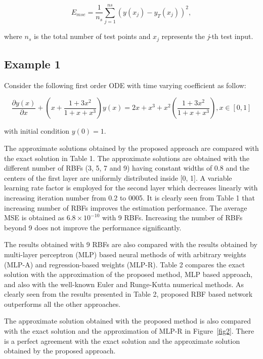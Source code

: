 \documentclass{mc}
\begin{document}
\begin{equation}
E_{mse}=\frac{1}{n_s}\sum_{j=1}^{ns}\left ( y(x_j)-y_T(x_j) \right )^{2},
\end{equation}

where $n_s$ is the total number of test points and $x_j$ represents the {\it{j}}-th test input.

\subsection{Example 1}

Consider the following first order ODE with time varying coefficient as follow:

\begin{equation}
\frac{\partial y(x)}{\partial x} + \left ( x + \frac{1+ 3x^2}{1+x+x^3}  \right )y(x)=2x+x^3+x^2\left (  \frac{1+ 3x^2}{1+x+x^3}  \right ), x\in [0 , 1]
\end{equation}

with initial condition $y(0)=1$.

The approximate solutions obtained by the proposed approach are compared with the exact solution in Table 1. The approximate solutions are obtained with the different number of RBFs (3, 5, 7 and 9) having constant widths of 0.8 and the centers of the first layer are uniformly distributed inside [0, 1]. A variable learning rate factor is employed for the second layer which decreases linearly with increasing iteration number from 0.2 to 0005. It is clearly seen from Table 1 that increasing number of RBFs improves the estimation performance. The average MSE is obtained as $6.8\times10^{-10}$ with 9 RBFs. Increasing the number of RBFs beyond 9 does not improve the performance significantly.

The results obtained with 9 RBFs are also compared with the results obtained by multi-layer perceptron (MLP) based neural methods of \cite{Mal1} with arbitrary weights (MLP-A) and regression-based weights (MLP-R). Table 2 compares the exact solution with the approximation of the proposed method, MLP based approach, and also with the well-known Euler and Runge-Kutta numerical methods. As clearly seen from the results presented in Table 2, proposed RBF based network outperforms all the other approaches.

The approximate solution obtained with the proposed method is also compared with the exact solution and the approximation of MLP-R in Figure~\ref{fig2}. There is a perfect agreement with the exact solution and the approximate solution obtained by the proposed approach.
\end{document}
